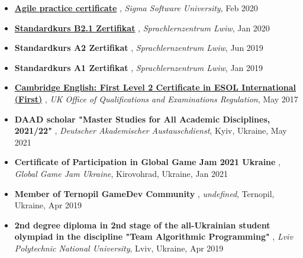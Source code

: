\documentclass[letterpaper,10pt]{article}
\newcommand{\titleItem}[1]{
  \textbf{#1}
}
\begin{document}
\begin{itemize}[leftmargin=0.15in, label={}]
    \item
			\titleItem{\href{https://drive.google.com/file/d/1LTYpV6Q1HNzGcMxh6HO4tlEtwELc0Pta/view?usp=sharing}{{Agile practice certificate}}}, \emph{Sigma Software University}, Feb 2020
			\vspace{-9pt}
		
    \item
			\titleItem{\href{https://drive.google.com/open?id=17kmCOkC1snH8HCPZ8kAo2MOrqXi1my6P}{{Standardkurs B2.1 Zertifikat}}}, \emph{Sprachlernzentrum Lwiw}, Jan 2020
			\vspace{-9pt}
		
    \item
			\titleItem{Standardkurs A2 Zertifikat}, \emph{Sprachlernzentrum Lwiw}, Jun 2019
			\vspace{-9pt}
		
    \item
			\titleItem{Standardkurs A1 Zertifikat}, \emph{Sprachlernzentrum Lwiw}, Jan 2019
			\vspace{-9pt}
		
    \item
			\titleItem{\href{https://drive.google.com/file/d/1qcIYSFNIVZ2rZL4G9o46xJTBmrIXxtuM/view?usp=sharing}{{Cambridge English: First Level 2 Certificate in ESOL International (First)}}}, \emph{UK Office of Qualifications and Examinations Regulation}, May 2017
			\vspace{-9pt}
		
\par\hrulefill

    \item
			\titleItem{DAAD scholar "Master Studies for All Academic Disciplines, 2021/22"}, \emph{Deutscher Akademischer Austauschdienst}, {Kyiv, Ukraine}, May 2021
			\vspace{-9pt}
		
    \item
			\titleItem{Certificate of Participation in Global Game Jam 2021 Ukraine}, \emph{Global Game Jam Ukraine}, {Kirovohrad, Ukraine}, Jan 2021
			\vspace{-9pt}
		
    \item
			\titleItem{Member of Ternopil GameDev Community}, \emph{undefined}, {Ternopil, Ukraine}, Apr 2019
			\vspace{-9pt}
		
    \item
			\titleItem{2nd degree diploma in 2nd stage of the all-Ukrainian student olympiad in the discipline "Team Algorithmic Programming"}, \emph{Lviv Polytechnic National University}, {Lviv, Ukraine}, Apr 2019
			\vspace{-9pt}
		

\end{itemize}
\end{document}

